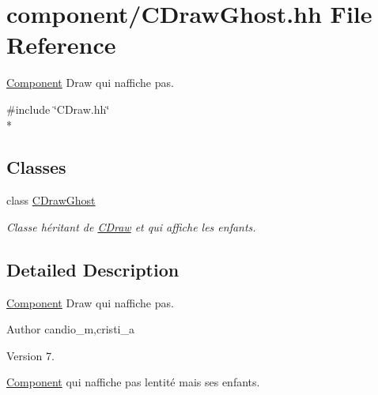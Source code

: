 \hypertarget{_c_draw_ghost_8hh}{}\section{component/\+C\+Draw\+Ghost.hh File Reference}
\label{_c_draw_ghost_8hh}


\hyperlink{class_component}{Component} Draw qui n\textquotesingle{}affiche pas.  


{\ttfamily \#include \char`\"{}C\+Draw.\+hh\char`\"{}}\\*
\subsection*{Classes}
\begin{DoxyCompactItemize}
\item 
class \hyperlink{class_c_draw_ghost}{C\+Draw\+Ghost}
\begin{DoxyCompactList}\small\item\em Classe héritant de \hyperlink{class_c_draw}{C\+Draw} et qui affiche les enfants. \end{DoxyCompactList}\end{DoxyCompactItemize}


\subsection{Detailed Description}
\hyperlink{class_component}{Component} Draw qui n\textquotesingle{}affiche pas. 

\begin{DoxyAuthor}{Author}
candio\+\_\+m,cristi\+\_\+a 
\end{DoxyAuthor}
\begin{DoxyVersion}{Version}
7.
\end{DoxyVersion}
\hyperlink{class_component}{Component} qui n\textquotesingle{}affiche pas l\textquotesingle{}entité mais ses enfants. 